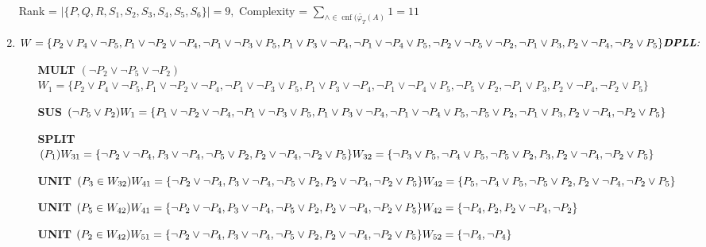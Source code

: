 \documentclass[a4paper,12pt]{article}
\DeclareMathOperator{\cnf}{cnf}
\begin{document}
\begin{enumerate}
\begin{align*}
		\end{align*}
		Rank = $\left|\{P,Q,R,S_1,S_2,S_3,S_4,S_5,S_6\}\right|=9,$ Complexity = $\displaystyle\sum_{\land\in\cnf(\tilde{\varphi_T}(A)}1=11$ 
	\item $W = \{P_2 \lor P_4 \lor  \neg P_5, P_1 \lor  \neg P_2 \lor  \neg P_4, \neg P_1 \lor  \neg P_3 \lor P_5, P_1 \lor P_3 \lor  \neg P_4, \neg P_1 \lor  \neg P_4 \lor P_5, \neg P_2 \lor  \neg P_5 \lor  \neg P_2,
\neg P_1 \lor  P_3, P_2 \lor  \neg P_4, \neg P_2 \lor P_5\} \\\\\emph{\textbf{DPLL}:}\\$
	\begin{itemize}
		\item [\textbf{MULT}] $(\neg P_2 \lor  \neg P_5 \lor  \neg P_2)$\\$W_1 = \{P_2 \lor P_4 \lor  \neg P_5, P_1 \lor  \neg P_2 \lor  \neg P_4, \neg P_1 \lor  \neg P_3 \lor P_5, P_1 \lor P_3 \lor  \neg P_4, \neg P_1 \lor  \neg P_4 \lor P_5,\neg P_5\lor P_2, \neg P_1 \lor  P_3, P_2 \lor  \neg P_4, \neg P_2 \lor P_5\} $
		\item [\textbf{SUS}] $(\neg P_5\lor P_2)\\W_1 = \{P_1 \lor  \neg P_2 \lor  \neg P_4, \neg P_1 \lor  \neg P_3 \lor P_5, P_1 \lor P_3 \lor  \neg P_4, \neg P_1 \lor  \neg P_4 \lor P_5,\neg P_5\lor P_2, \neg P_1 \lor  P_3, P_2 \lor  \neg P_4, \neg P_2 \lor P_5\} $
		\item [\textbf{SPLIT}] $(P_1)\\W_{31} = \{\neg P_2 \lor  \neg P_4, P_3 \lor  \neg P_4, \neg P_5\lor P_2, P_2 \lor  \neg P_4, \neg P_2 \lor P_5\}\\W_{32} = \{\neg P_3 \lor P_5, \neg P_4 \lor P_5,\neg P_5\lor P_2, P_3, P_2 \lor  \neg P_4, \neg P_2 \lor P_5\}$
		\item [\textbf{UNIT}] $(P_3\in W_{32})\\W_{41} = \{\neg P_2 \lor  \neg P_4, P_3 \lor  \neg P_4, \neg P_5\lor P_2, P_2 \lor  \neg P_4, \neg P_2 \lor P_5\}\\W_{42} = \{P_5, \neg P_4 \lor P_5,\neg P_5\lor P_2,  P_2 \lor  \neg P_4, \neg P_2 \lor P_5\}$
		\item [\textbf{UNIT}] $(P_5\in W_{42})\\W_{41} = \{\neg P_2 \lor  \neg P_4, P_3 \lor  \neg P_4, \neg P_5\lor P_2, P_2 \lor  \neg P_4, \neg P_2 \lor P_5\}\\W_{42} = \{ \neg P_4 , P_2,  P_2 \lor  \neg P_4, \neg P_2 \}$
		\item [\textbf{UNIT}] $(P_2\in W_{42})\\W_{51} = \{\neg P_2 \lor  \neg P_4, P_3 \lor  \neg P_4, \neg P_5\lor P_2, P_2 \lor  \neg P_4, \neg P_2 \lor P_5\}\\W_{52} = \{ \neg P_4 , \neg P_4\}$

\end{itemize}
\end{enumerate}
\end{document}
